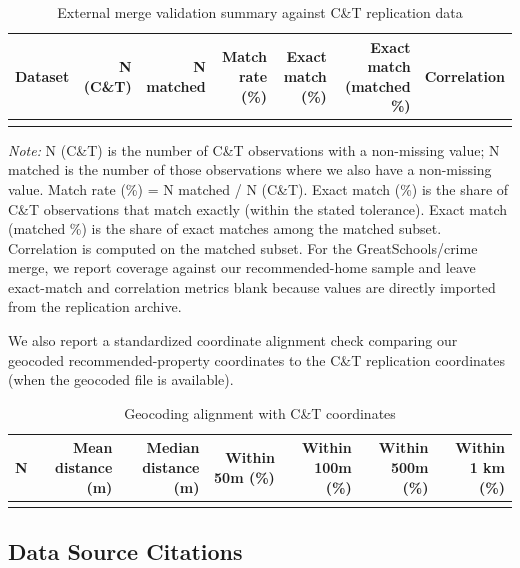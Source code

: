 \documentclass{article}
\begin{document}
\begin{landscape}
\begin{table}[p]
\centering
\small
\caption{External merge validation summary against C\&T replication data}
\begin{tabular}{lrrrrrr}
\toprule
Dataset & N (C\&T) & N matched & Match rate (\%) & Exact match (\%) & Exact match (matched \%) & Correlation \\
\midrule
\\
\bottomrule
\end{tabular}
\vspace{0.5em}
\begin{minipage}{0.95\linewidth}
\footnotesize\textit{Note:} N (C\&T) is the number of C\&T observations with a non-missing value; N matched is the number of those observations where we also have a non-missing value. Match rate (\%) = N matched / N (C\&T). Exact match (\%) is the share of C\&T observations that match exactly (within the stated tolerance). Exact match (matched \%) is the share of exact matches among the matched subset. Correlation is computed on the matched subset. For the GreatSchools/crime merge, we report coverage against our recommended-home sample and leave exact-match and correlation metrics blank because values are directly imported from the replication archive.
\end{minipage}
\end{table}
\end{landscape}

We also report a standardized coordinate alignment check comparing our geocoded recommended-property coordinates to the C\&T replication coordinates (when the geocoded file is available).

\begin{landscape}
\begin{table}[p]
\centering
\small
\caption{Geocoding alignment with C\&T coordinates}
\begin{tabular}{rrrrrrr}
\toprule
N & Mean distance (m) & Median distance (m) & Within 50m (\%) & Within 100m (\%) & Within 500m (\%) & Within 1 km (\%) \\
\midrule
\\
\bottomrule
\end{tabular}
\end{table}
\end{landscape}

\subsection{Data Source Citations}
\end{document}
